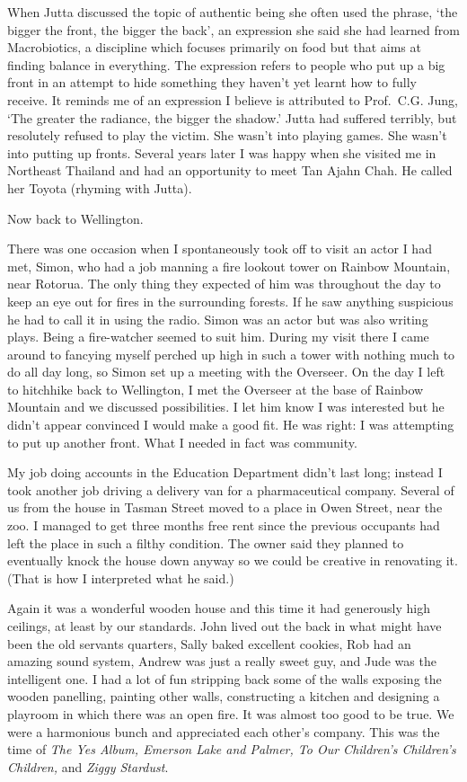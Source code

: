 When Jutta discussed the topic of authentic being she often used the
phrase, `the bigger the front, the bigger the back', an expression she
said she had learned from Macrobiotics, a discipline which focuses
primarily on food but that aims at finding balance in everything. The
expression refers to people who put up a big front in an attempt to hide
something they haven't yet learnt how to fully receive. It reminds me of
an expression I believe is attributed to Prof.~C.G. Jung, `The greater
the radiance, the bigger the shadow.' Jutta had suffered terribly, but
resolutely refused to play the victim. She wasn't into playing games.
She wasn't into putting up fronts. Several years later I was happy when
she visited me in Northeast Thailand and had an opportunity to meet Tan
Ajahn Chah. He called her Toyota (rhyming with Jutta).

Now back to Wellington.

There was one occasion when I spontaneously took off to visit an actor I
had met, Simon, who had a job manning a fire lookout tower on
Rainbow Mountain\cite{rainbow-mountain}, near Rotorua. The only thing they expected of him
was throughout the day to keep an eye out for fires in the surrounding
forests. If he saw anything suspicious he had to call it in using the
radio. Simon was an actor but was also writing plays. Being a
fire-watcher seemed to suit him. During my visit there I came around to
fancying myself perched up high in such a tower with nothing much to do
all day long, so Simon set up a meeting with the Overseer. On the day I
left to hitchhike back to Wellington, I met the Overseer at the base of
Rainbow Mountain and we discussed possibilities. I let him know I was
interested but he didn't appear convinced I would make a good fit. He
was right: I was attempting to put up another front. What I needed in
fact was community.

My job doing accounts in the Education Department didn't last long;
instead I took another job driving a delivery van for a pharmaceutical
company. Several of us from the house in Tasman Street moved to a place
in Owen Street, near the zoo. I managed to get three months free rent
since the previous occupants had left the place in such a filthy
condition. The owner said they planned to eventually knock the house
down anyway so we could be creative in renovating it. (That is how I
interpreted what he said.)

Again it was a wonderful wooden house and this time it had generously
high ceilings, at least by our standards. John lived out the back in
what might have been the old servants quarters, Sally baked excellent
cookies, Rob had an amazing sound system, Andrew was just a really sweet
guy, and Jude was the intelligent one. I had a lot of fun stripping back
some of the walls exposing the wooden panelling, painting other walls,
constructing a kitchen and designing a playroom in which there was an
open fire. It was almost too good to be true. We were a harmonious bunch
and appreciated each other's company. This was the time of \emph{The Yes
Album, Emerson Lake and Palmer, To Our Children's Children's Children,}
and \emph{Ziggy Stardust}.

